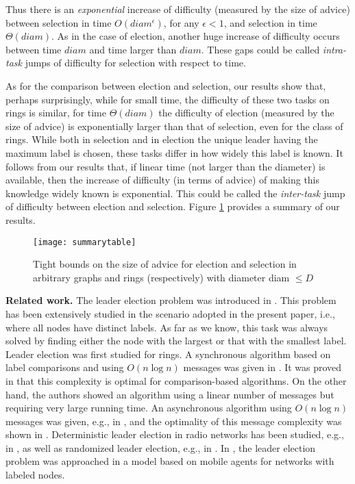 \documentclass[11pt]{article}
\begin{document}
 
 
 
 Thus there is an {\em exponential} increase of difficulty (measured by the size of advice) between selection in time $O(diam^{\epsilon})$, for any $\epsilon <1$,
and selection in time $\Theta(diam)$. As in the case of election, another huge increase of difficulty occurs between time $diam$ and time larger than $diam$.  These gaps could be called {\em intra-task} jumps of difficulty for selection with respect to time. 

 As for the comparison between election and selection, our results show that, perhaps surprisingly, while  for small time, the difficulty of these two tasks 
 on rings is similar, for time  $\Theta(diam)$ the difficulty of election (measured by the size of advice) is exponentially larger than that of selection,
even for the class of rings.
 While both in selection and in election the unique leader having the maximum label is chosen, these tasks differ in how widely this label is known. It follows from our results that,
if linear time (not larger than the diameter) is available, then the increase of difficulty (in terms of advice) of making this knowledge widely known is exponential.
This could be called the {\em inter-task} jump of difficulty between election and selection.  Figure \ref{summarytable} provides a summary of our results.


\begin{figure}[!ht]
\begin{center}
\texttt{[image: summarytable]}
\end{center}
\caption{Tight bounds on the size of advice for election and selection in arbitrary graphs and rings (respectively) with diameter diam $\leq D$}
\label{summarytable}
\end{figure}












\noindent
{\bf Related work.}
The leader election problem was introduced in \cite{LL}. This problem  has been extensively studied in the scenario adopted in the present paper, i.e.,
where all nodes have distinct labels. As far as we know, this task was always solved by finding either the node with the largest or that with the smallest label.
Leader election was first studied for rings.
A synchronous algorithm based on label comparisons and using
$O(n \log n)$ messages was given in \cite{HS}. It was proved in \cite{FL} that
this complexity is optimal for comparison-based algorithms. On the other hand, the authors showed
an algorithm using a linear number of messages but requiring very large running time.
An asynchronous algorithm using $O(n \log n)$ messages was given, e.g., in \cite{P}, and
the optimality of this message complexity was shown in \cite{B}. Deterministic leader election in radio networks has been studied, e.g., 
in \cite{JKZ,KP,NO}, as well as randomized leader election, e.g., in \cite{Wil}. In \cite{HKMMJ}, the leader election problem was
approached in a model based on mobile agents for networks with labeled nodes.
\end{document}
